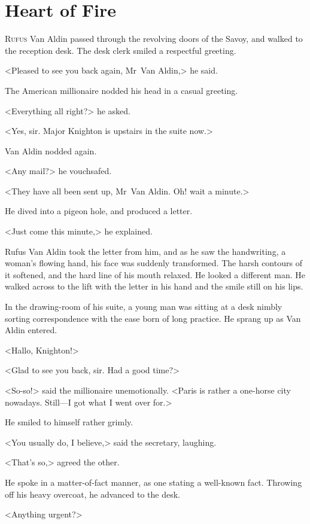 \chapter{Heart of Fire}



\lettrine{R}{ufus} Van Aldin passed through the revolving doors of the Savoy, and walked to the reception desk. The desk clerk smiled a respectful greeting.

\zz
<Pleased to see you back again, Mr~Van Aldin,> he said.

\zz
The American millionaire nodded his head in a casual greeting.

<Everything all right?> he asked.

<Yes, sir. Major Knighton is upstairs in the suite now.>

Van Aldin nodded again.

<Any mail?> he vouchsafed.

<They have all been sent up, Mr~Van Aldin. Oh! wait a minute.>

He dived into a pigeon hole, and produced a letter.

<Just come this minute,> he explained.

Rufus Van Aldin took the letter from him, and as he saw the handwriting, a woman's flowing hand, his face was suddenly transformed. The harsh contours of it softened, and the hard line of his mouth relaxed. He looked a different man. He walked across to the lift with the letter in his hand and the smile still on his lips.

In the drawing-room of his suite, a young man was sitting at a desk nimbly sorting correspondence with the ease born of long practice. He sprang up as Van Aldin entered.

<Hallo, Knighton!>

<Glad to see you back, sir. Had a good time?>

<So-so!> said the millionaire unemotionally. <Paris is rather a one-horse city nowadays. Still—I got what I went over for.>

He smiled to himself rather grimly.

<You usually do, I believe,> said the secretary, laughing.

<That's so,> agreed the other.

He spoke in a matter-of-fact manner, as one stating a well-known fact. Throwing off his heavy overcoat, he advanced to the desk.

<Anything urgent?>

